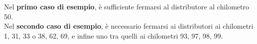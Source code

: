 \Examples
\begin{example}
%
\end{example}
\begin{example}
%
\end{example}


\Explanation
Nel \textbf{primo caso di esempio}, è sufficiente fermarsi al distributore al chilometro 50.\\[2mm]
Nel \textbf{secondo caso di esempio}, è necessario fermarsi ai distributori ai chilometri 1, 31, 33 o 38, 62, 69, e infine uno tra quelli ai chilometri 93, 97, 98, 99.
